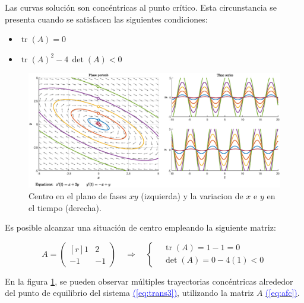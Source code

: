 \documentclass[12pt,a4paper]{report} %
\newcommand{\eref}[1]{\hyperref[#1]{\textcolor{blue}{(\ref*{#1})}}}
\newcommand{\tr}{\operatorname{\textrm{tr}}}
\begin{document}
	\newpage
	
    \vspace{1cm}
    
    \vspace{0.3cm}\noindent Las curvas solución son concéntricas al punto crítico. Esta circunstancia se presenta cuando se satisfacen las siguientes condiciones: 
    \begin{itemize}
    	\item $\tr(A)=0$
    	\item $\tr(A)^2-4\, \det(A)<0$
    \end{itemize}
    
    \begin{figure}[h]
    	\centering
    	\includegraphics[width=1\textwidth]{centro.eps}
    	\caption{Centro en el plano de fases $xy$ (izquierda) y la variacion de $x$ e $y$ en el tiempo (derecha).}
    	\label{fig:centro}
    \end{figure}\smallskip
    
   	\vspace{0.3cm}\noindent Es posible alcanzar una situación de centro empleando la siguiente matriz:
    
	\begin{equation}
	\label{eq:afc}
	A=\begin{pmatrix*}[r]
		1 & 2 \\
		-1 & -1
	\end{pmatrix*} \quad \Longrightarrow \quad 
	\left\{ 
	\begin{aligned}
		&\tr(A)=1-1=0 \\[2mm]
		&\det(A)=0-4(1)<0
	\end{aligned}
	\right.
\end{equation}\smallskip

\vspace{0.5cm}\noindent En la figura \ref{fig:centro}, se pueden observar múltiples trayectorias concéntricas alrededor del punto de equilibrio del sistema \eref{eq:trans3}, utilizando la matriz $A$ \eref{eq:afc}.
	
\end{document}
